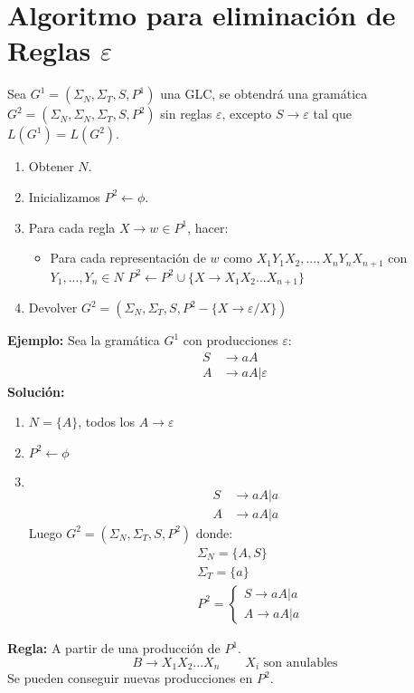 \section{Algoritmo para eliminación de Reglas $\varepsilon$}
Sea $G^1=(\Sigma_N,\Sigma_T,S,P^1)$ una GLC, se obtendrá una gramática $G^2=(\Sigma_N,\Sigma_N,\Sigma_T,S,P^2)$ sin reglas $\varepsilon$, excepto $S\rightarrow \varepsilon$ tal que $L(G^1)=L(G^2)$.
\begin{enumerate}
\item Obtener $N$.
\item Inicializamos $P^2 \leftarrow \phi$.
\item Para cada regla $X\rightarrow w\in P^1$, hacer:
	\begin{itemize}
	\item Para cada representación de $w$ como $X_1Y_1X_2,...,X_nY_nX_{n+1}$ con $Y_1,...,Y_n\in N$    $P^2 \leftarrow P^2\cup \{ X\rightarrow X_1X_2...X_{n+1}\}$
	\end{itemize}
\item Devolver $G^2=(\Sigma_N,\Sigma_T,S,P^2-\{X\rightarrow\varepsilon /X\} )$
\end{enumerate}
\textbf{Ejemplo: }Sea la gramática $G^1$ con producciones $\varepsilon$:
\begin{align*}
S	&\rightarrow aA	\\
A	&\rightarrow aA|\varepsilon
\end{align*}
\textbf{Solución: }
\begin{enumerate}
\item $N=\{A\}$, todos los $A\rightarrow\varepsilon$
\item $P^2\leftarrow \phi$
\item $\,$\\
	\begin{align*}
	S	&\rightarrow aA|a	\\
	A	&\rightarrow aA|a
	\end{align*}
Luego $G^2=(\Sigma_N,\Sigma_T,S,P^2)$ donde:
	\begin{align*}
	&\Sigma_N=\{ A,S\}	\\
	&\Sigma_T=\{a\}	\\
	&P^2=\left \{ \begin{array}{l}
	S\rightarrow aA|a	\\
	A\rightarrow aA|a	
	\end{array}\right.
	\end{align*}
\end{enumerate}

\textbf{Regla: }A partir de una producción de $P^1$.
$$B\rightarrow X_1X_2...X_n\qquad X_i \mbox{ son anulables}$$
Se pueden conseguir nuevas producciones en $P^2$.

